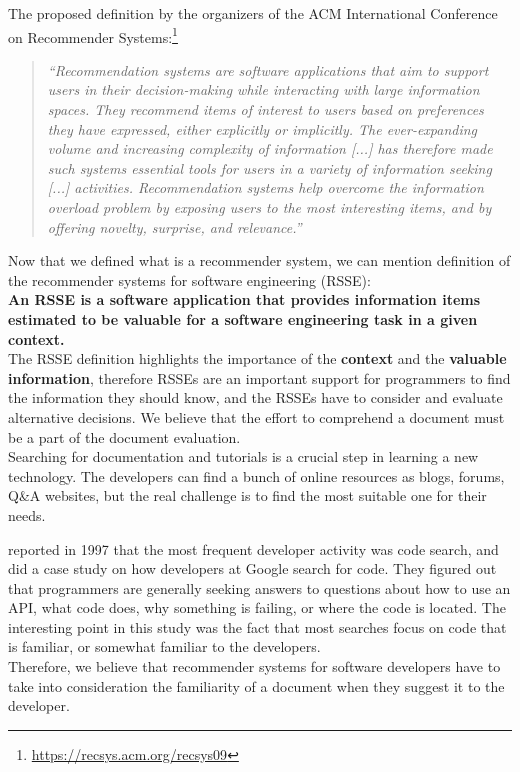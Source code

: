 \documentclass[12pt,mscthesis]{usiinfthesis}
\begin{document}
	The proposed definition by the organizers of the ACM International Conference on Recommender Systems:\footnote{\url{https://recsys.acm.org/recsys09}} \\

	  \blockquote{\textit{``Recommendation systems are software applications that aim to support users in their decision-making while interacting with large information spaces. They recommend items of interest to users based on preferences they have expressed, either explicitly or implicitly. The ever-expanding volume and increasing complexity of information [...] has therefore made such systems essential tools for users in a variety of information seeking [...] activities. Recommendation systems help overcome the information overload problem by exposing users to the most interesting items, and by offering novelty, surprise, and relevance.''}}
	Now that we defined what is a recommender system, we can mention \citet{RecommendationSystemsforSoftwareEngineering} definition of the recommender systems for software engineering (RSSE):\\

	\textbf{An RSSE is a software application that provides information items estimated to be valuable for a software engineering task in a given context.}\\

	The RSSE definition highlights the importance of the \textbf{context} and the \textbf{valuable information}, therefore RSSEs are an important support for programmers to find the information they should know, and the RSSEs have to consider and evaluate alternative decisions. We believe that the effort to comprehend a document must be a part of the document evaluation.\\


	Searching for documentation and tutorials is a crucial step in learning a new technology. The developers can find a bunch of online resources as blogs, forums, Q\&A websites, but the real challenge is to find the most suitable one for their needs.



	\citet{Singer-1997} reported in 1997 that the most frequent developer activity was code search, and \citet{Sadowski:2015} did a case study on how developers at Google search for code. They figured out that programmers are generally seeking answers to questions about how to use an API, what code does, why something is failing, or where the code is located. The interesting point in this study was the fact that most searches focus on code that is familiar, or somewhat familiar to the developers.\\
	Therefore, we believe that recommender systems for software developers have to take into consideration the familiarity of a document when they suggest it to the developer. 
\end{document}
